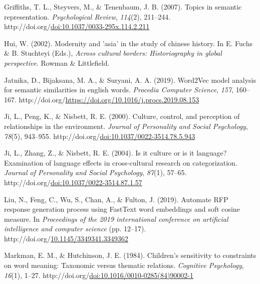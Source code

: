 \documentclass[10pt, letterpaper]{article}
\newenvironment{CSLReferences}%
  {}%
  {\par}
\begin{document}
\begin{CSLReferences}{1}{0}
\leavevmode{}%
Griffiths, T. L., Steyvers, M., \& Tenenbaum, J. B. (2007). Topics in
semantic representation. \emph{Psychological Review}, \emph{114}(2),
211--244.
http://doi.org/\href{https://doi.org/doi:10.1037/0033-295x.114.2.211}{doi:10.1037/0033-295x.114.2.211}

\leavevmode{}%
Hui, W. (2002). Modernity and 'asia' in the study of chinese history. In
E. Fuchs \& B. Stuchteyi (Eds.), \emph{Across cultural borders:
Historiography in global perspective}. Rowman \& Littlefield.

\leavevmode{}%
Jatnika, D., Bijaksana, M. A., \& Suryani, A. A. (2019). Word2Vec model
analysis for semantic similarities in english words. \emph{Procedia
Computer Science}, \emph{157}, 160--167.
http://doi.org/\url{https://doi.org/10.1016/j.procs.2019.08.153}

\leavevmode{}%
Ji, L., Peng, K., \& Nisbett, R. E. (2000). Culture, control, and
perception of relationships in the environment. \emph{Journal of
Personality and Social Psychology}, \emph{78}(5), 943--955.
http://doi.org/\href{https://doi.org/doi:10.1037/0022-3514.78.5.943}{doi:10.1037/0022-3514.78.5.943}

\leavevmode{}%
Ji, L., Zhang, Z., \& Nisbett, R. E. (2004). Is it culture or is it
language? Examination of language effects in cross-cultural research on
categorization. \emph{Journal of Personality and Social Psychology},
\emph{87}(1), 57--65.
http://doi.org/\href{https://doi.org/doi:10.1037/0022-3514.87.1.57}{doi:10.1037/0022-3514.87.1.57}

\leavevmode{}%
Liu, N., Feng, C., Wu, S., Chan, A., \& Fulton, J. (2019). Automate RFP
response generation process using FastText word embeddings and soft
cosine measure. In \emph{Proceedings of the 2019 international
conference on artificial intelligence and computer science} (pp.
12--17).
http://doi.org/\href{https://doi.org/10.1145/3349341.3349362}{10.1145/3349341.3349362}

\leavevmode{}%
Markman, E. M., \& Hutchinson, J. E. (1984). Children's sensitivity to
constraints on word meaning: Taxonomic versus thematic relations.
\emph{Cognitive Psychology}, \emph{16}(1), 1--27.
http://doi.org/\href{https://doi.org/doi:10.1016/0010-0285(84)90002-1}{doi:10.1016/0010-0285(84)90002-1}


\end{CSLReferences}
\end{document}
